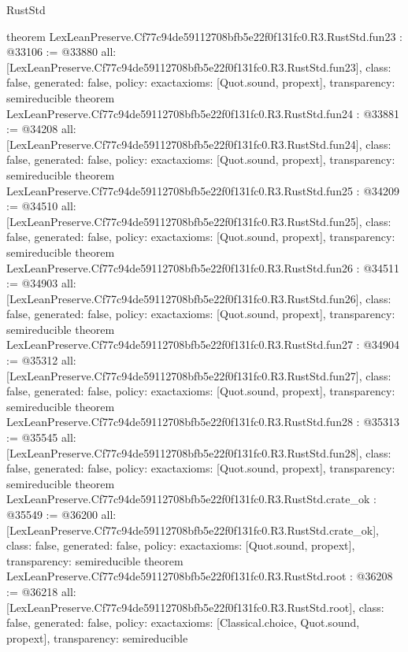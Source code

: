 \begin{lexlean}{RustStd}
\begin{coremodule}
{}
theorem LexLeanPreserve.Cf77c94de59112708bfb5e22f0f131fc0.R3.RustStd.fun23 : @33106 := @33880 {
  all: [LexLeanPreserve.Cf77c94de59112708bfb5e22f0f131fc0.R3.RustStd.fun23],
  class: false,
  generated: false,
  policy: exact{axioms: [Quot.sound, propext]},
  transparency: semireducible
}
theorem LexLeanPreserve.Cf77c94de59112708bfb5e22f0f131fc0.R3.RustStd.fun24 : @33881 := @34208 {
  all: [LexLeanPreserve.Cf77c94de59112708bfb5e22f0f131fc0.R3.RustStd.fun24],
  class: false,
  generated: false,
  policy: exact{axioms: [Quot.sound, propext]},
  transparency: semireducible
}
theorem LexLeanPreserve.Cf77c94de59112708bfb5e22f0f131fc0.R3.RustStd.fun25 : @34209 := @34510 {
  all: [LexLeanPreserve.Cf77c94de59112708bfb5e22f0f131fc0.R3.RustStd.fun25],
  class: false,
  generated: false,
  policy: exact{axioms: [Quot.sound, propext]},
  transparency: semireducible
}
theorem LexLeanPreserve.Cf77c94de59112708bfb5e22f0f131fc0.R3.RustStd.fun26 : @34511 := @34903 {
  all: [LexLeanPreserve.Cf77c94de59112708bfb5e22f0f131fc0.R3.RustStd.fun26],
  class: false,
  generated: false,
  policy: exact{axioms: [Quot.sound, propext]},
  transparency: semireducible
}
theorem LexLeanPreserve.Cf77c94de59112708bfb5e22f0f131fc0.R3.RustStd.fun27 : @34904 := @35312 {
  all: [LexLeanPreserve.Cf77c94de59112708bfb5e22f0f131fc0.R3.RustStd.fun27],
  class: false,
  generated: false,
  policy: exact{axioms: [Quot.sound, propext]},
  transparency: semireducible
}
theorem LexLeanPreserve.Cf77c94de59112708bfb5e22f0f131fc0.R3.RustStd.fun28 : @35313 := @35545 {
  all: [LexLeanPreserve.Cf77c94de59112708bfb5e22f0f131fc0.R3.RustStd.fun28],
  class: false,
  generated: false,
  policy: exact{axioms: [Quot.sound, propext]},
  transparency: semireducible
}
theorem LexLeanPreserve.Cf77c94de59112708bfb5e22f0f131fc0.R3.RustStd.crate_ok : @35549 := @36200 {
  all: [LexLeanPreserve.Cf77c94de59112708bfb5e22f0f131fc0.R3.RustStd.crate_ok],
  class: false,
  generated: false,
  policy: exact{axioms: [Quot.sound, propext]},
  transparency: semireducible
}
theorem LexLeanPreserve.Cf77c94de59112708bfb5e22f0f131fc0.R3.RustStd.root : @36208 := @36218 {
  all: [LexLeanPreserve.Cf77c94de59112708bfb5e22f0f131fc0.R3.RustStd.root],
  class: false,
  generated: false,
  policy: exact{axioms: [Classical.choice, Quot.sound, propext]},
  transparency: semireducible
}


\end{coremodule}
\end{lexlean}
